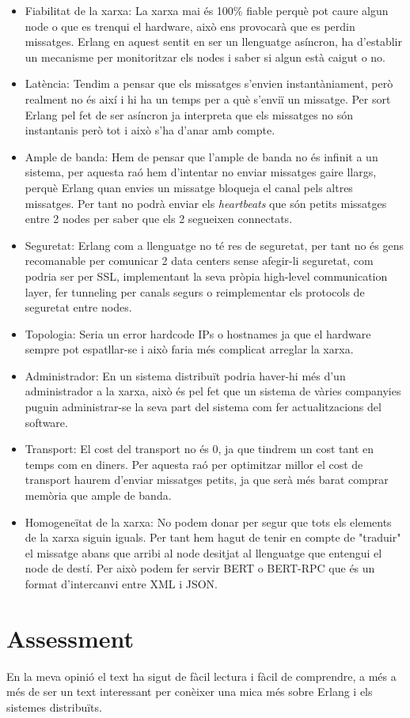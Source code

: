 \documentclass[a4paper, 10pt]{article}
\begin{document}
\begin{itemize}
\item Fiabilitat de la xarxa: La xarxa mai és 100\% fiable perquè pot caure algun node o que es trenqui el hardware, això ens provocarà que es perdin missatges. Erlang en aquest sentit en ser un llenguatge asíncron, ha d'establir un mecanisme per monitoritzar els nodes i saber si algun està caigut o no.
\item Latència: Tendim a pensar que els missatges s'envien instantàniament, però realment no és així i hi ha un temps per a què s'enviï un missatge. Per sort Erlang pel fet de ser asíncron ja interpreta que els missatges no són instantanis però tot i això s'ha d'anar amb compte.
\item Ample de banda: Hem de pensar que l'ample de banda no és infinit a un sistema, per aquesta raó hem d'intentar no enviar missatges gaire llargs, perquè Erlang quan envies un missatge bloqueja el canal pels altres missatges. Per tant no podrà enviar els \textit{heartbeats} que són petits missatges entre 2 nodes per saber que els 2 segueixen connectats.
\item Seguretat: Erlang com a llenguatge no té res de seguretat, per tant no és gens recomanable per comunicar 2 data centers sense afegir-li seguretat, com podria ser per SSL, implementant la seva pròpia high-level communication layer, fer tunneling per canals segurs o reimplementar els protocols de seguretat entre nodes.
\item Topologia: Seria un error hardcode IPs o hostnames ja que el hardware sempre pot espatllar-se i això faria més complicat arreglar la xarxa.
\item Administrador: En un sistema distribuït podria haver-hi més d'un administrador a la xarxa, això és pel fet que un sistema de vàries companyies puguin administrar-se la seva part del sistema com fer actualitzacions del software.
\item Transport: El cost del transport no és 0, ja que tindrem un cost tant en temps com en diners. Per aquesta raó per optimitzar millor el cost de transport haurem d'enviar missatges petits, ja que serà més barat comprar memòria que ample de banda.
\item Homogeneïtat de la xarxa: No podem donar per segur que tots els elements de la xarxa siguin iguals. Per tant hem hagut de tenir en compte de "traduir" el missatge abans que arribi al node desitjat al llenguatge que entengui el node de destí. Per això podem fer servir BERT o BERT-RPC que és un format d'intercanvi entre XML i JSON.
\end{itemize}

\section{Assessment}

En la meva opinió el text ha sigut de fàcil lectura i fàcil de comprendre, a més a més de ser un text interessant per conèixer una mica més sobre Erlang i els sistemes distribuïts.
\end{document}
